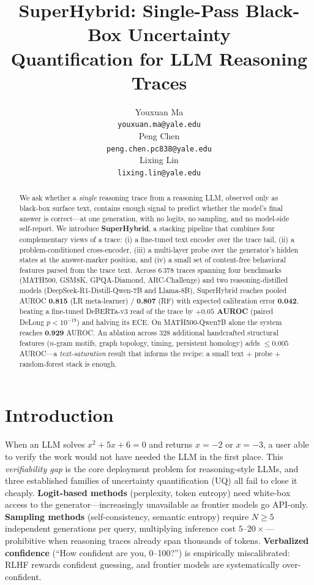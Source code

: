 \documentclass{article}
\title{SuperHybrid: Single-Pass Black-Box Uncertainty\\
       Quantification for LLM Reasoning Traces}
\author{
  Youxuan Ma \\
  \texttt{youxuan.ma@yale.edu}\\
  Peng Chen \\
  \texttt{peng.chen.pc838@yale.edu} \\
  Lixing Lin \\
  \texttt{lixing.lin@yale.edu} \\
}
\begin{document}
\maketitle

\begin{abstract}
We ask whether a \emph{single} reasoning trace from a reasoning LLM, observed
only as black-box surface text, contains enough signal to predict whether the
model's final answer is correct---at one generation, with no logits, no
sampling, and no model-side self-report. We introduce \textbf{SuperHybrid}, a
stacking pipeline that combines four complementary views of a trace: (i) a
fine-tuned text encoder over the trace tail, (ii) a problem-conditioned
cross-encoder, (iii) a multi-layer probe over the generator's hidden states at
the answer-marker position, and (iv) a small set of content-free behavioral
features parsed from the trace text. Across $6\,378$ traces spanning four
benchmarks (MATH500, GSM8K, GPQA-Diamond, ARC-Challenge) and two
reasoning-distilled models (DeepSeek-R1-Distill-Qwen-7B and Llama-8B),
SuperHybrid reaches pooled AUROC \textbf{0.815} (LR meta-learner) /
\textbf{0.807} (RF) with expected calibration error \textbf{0.042}, beating a
fine-tuned DeBERTa-v3 read of the trace by \textbf{$+0.05$ AUROC} (paired DeLong
$p < 10^{-19}$) and halving its ECE. On MATH500-Qwen7B alone the system reaches
\textbf{0.929} AUROC. An ablation across $328$ additional handcrafted structural features
($n$-gram motifs, graph topology, timing, persistent homology) adds
$\le 0.005$ AUROC---a \emph{text-saturation} result that informs the recipe:
a small text + probe + random-forest stack is enough.
\end{abstract}

\section{Introduction}

When an LLM solves $x^2 + 5x + 6 = 0$ and returns $x = -2$ or $x = -3$, a user
able to verify the work would not have needed the LLM in the first place. This
\emph{verifiability gap} is the core deployment problem for reasoning-style
LLMs, and three established families of uncertainty quantification (UQ) all
fail to close it cheaply. \textbf{Logit-based methods} (perplexity, token
entropy) need white-box access to the generator---increasingly unavailable as
frontier models go API-only. \textbf{Sampling methods} (self-consistency,
semantic entropy) require $N \ge 5$ independent generations per query,
multiplying inference cost $5$--$20\times$---prohibitive when reasoning traces
already span thousands of tokens. \textbf{Verbalized confidence} (``How
confident are you, 0--100?'') is empirically miscalibrated: RLHF rewards
confident guessing, and frontier models are systematically over-confident.
\end{document}

